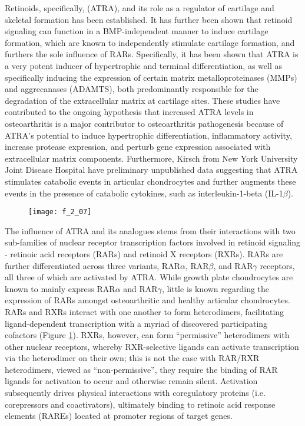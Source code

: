 \begin{refsection}
Retinoids, specifically,  (ATRA), and its role
as a regulator of cartilage and skeletal formation has been
established.\cite{Koyama1999} It has further been shown that retinoid signaling
can function in a BMP-independent manner to induce cartilage formation, which
are known to independently stimulate cartilage formation, and furthers the sole
influence of RARs.\cite{Weston2000} Specifically, it has been shown that ATRA is
a very potent inducer of hypertrophic and terminal differentiation, as well as
specifically inducing the expression of certain matrix metalloproteinases (MMPs)
and aggrecanases (ADAMTS), both predominantly responsible for the degradation of
the extracellular matrix at cartilage
sites.\cite{Wang2002,Iwamoto1994,Koyama1999,Johnson2003} These studies have
contributed to the ongoing hypothesis that increased ATRA levels in
osteoarthritis is a major contributor to osteoarthritis pathogenesis because of
ATRA's potential to induce hypertrophic differentiation, inflammatory activity,
increase protease expression, and perturb gene expression associated with
extracellular matrix components. Furthermore, Kirsch  from New
York University Joint Disease Hospital have preliminary unpublished data
suggesting that ATRA stimulates catabolic events in articular chondrocytes and
further augments these events in the presence of catabolic cytokines, such as
interleukin-1-beta (IL-1${\beta}$).
\begin{figure}[h!] \centering \texttt{[image: f\_2\_07]}
    \caption[]{\cite{DeLera2007}}\label{fig:retinoid_receptor_structures} \end{figure}
The influence of ATRA and its analogues stems from their interactions with two
sub-families of nuclear receptor transcription factors involved in retinoid
signaling - retinoic acid receptors (RARs) and retinoid X receptors (RXRs). RARs
are further differentiated across three variants, RAR${\alpha}$, RAR${\beta}$,
and RAR${\gamma}$ receptors, all three of which are activated by
ATRA.\cite{Chambon1996} While growth plate chondrocytes are known to mainly
express RAR${\alpha}$ and RAR${\gamma}$,\cite{Koyama1999} little is known
regarding the expression of RARs amongst osteoarthritic and healthy articular
chondrocytes. RARs and RXRs interact with one another to form heterodimers,
facilitating ligand-dependent transcription with a myriad of discovered
participating cofactors (Figure \ref{fig:retinoid_receptor_structures}). RXRs, however,
can form ``permissive'' heterodimers with other nuclear receptors, whereby
RXR-selective ligands can activate transcription via the heterodimer on their
own; this is not the case with RAR/RXR heterodimers, viewed as
``non-permissive'', they require the binding of RAR ligands for activation to
occur and otherwise remain silent.\cite{Altucci2007} Activation subsequently
drives physical interactions with coregulatory proteins (i.e. corepressors and
coactivators), ultimately binding to retinoic acid response elements (RAREs)
located at promoter regions of target genes.\cite{Germain2002,DeLera2007}


\end{refsection}
